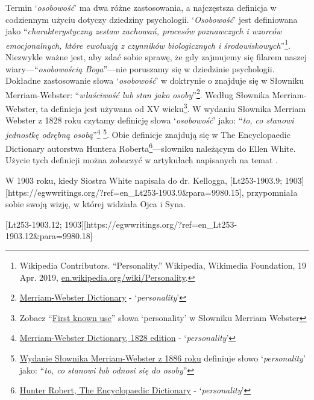 Termin ‘\textit{osobowość}’ ma dwa różne zastosowania, a najczęstsza definicja w codziennym użyciu dotyczy dziedziny psychologii. ‘\textit{Osobowość}’ jest definiowana jako “\textit{charakterystyczny zestaw zachowań, procesów poznawczych i wzorców emocjonalnych, które ewoluują z czynników biologicznych i środowiskowych}”\footnote{Wikipedia Contributors. “Personality.” Wikipedia, Wikimedia Foundation, 19 Apr. 2019, \href{https://en.wikipedia.org/wiki/Personality}{en.wikipedia.org/wiki/Personality}.}. Niezwykle ważne jest, aby zdać sobie sprawę, że gdy zajmujemy się filarem naszej wiary—“\textit{osobowością Boga}”—nie poruszamy się w dziedzinie psychologii. Dokładne zastosowanie słowa ‘\textit{osobowość}’ w doktrynie o  znajduje się w Słowniku Merriam-Webster: “\textit{właściwość lub stan jako osoby}”\footnote{\href{https://www.merriam-webster.com/dictionary/personality}{Merriam-Webster Dictionary} - ‘\textit{personality}’}. Według Słownika Merriam-Webster, ta definicja jest używana od XV wieku\footnote{Zobacz “\href{https://www.merriam-webster.com/dictionary/personality\#word-history}{First known use}” słowa ‘personality’ w Słowniku Merriam Webster}. W wydaniu Słownika Merriam Webster z 1828 roku czytamy definicję słowa ‘\textit{osobowość}’ jako: “\textit{to, co stanowi jednostkę odrębną osobą}”\footnote{\href{https://archive.org/details/americandictiona02websrich/page/272/mode/2up}{Merriam-Webster Dictionary, 1828 edition} - ‘\textit{personality}’} \footnote{\href{https://archive.org/details/websterscomplete00webs/page/974/mode/2up}{Wydanie Słownika Merriam-Webster z 1886 roku} definiuje słowo ‘\textit{personality}’ jako: “\textit{to, co stanowi lub odnosi się do osoby}”}. Obie definicje znajdują się w The Encyclopaedic Dictionary autorstwa Huntera Roberta\footnote{\href{https://babel.hathitrust.org/cgi/pt?id=mdp.39015050663213&view=1up&seq=780}{Hunter Robert, The Encyclopaedic Dictionary} - ‘\textit{personality}’}—słowniku należącym do Ellen White. Użycie tych definicji można zobaczyć w artykułach napisanych na temat .

W 1903 roku, kiedy Siostra White napisała do dr. Kellogga, [Lt253-1903.9; 1903][https://egwwritings.org/?ref=en\_Lt253-1903.9&para=9980.15], przypomniała sobie swoją wizję, w której widziała Ojca i Syna.

[Lt253-1903.12; 1903][https://egwwritings.org/?ref=en\_Lt253-1903.12&para=9980.18]





